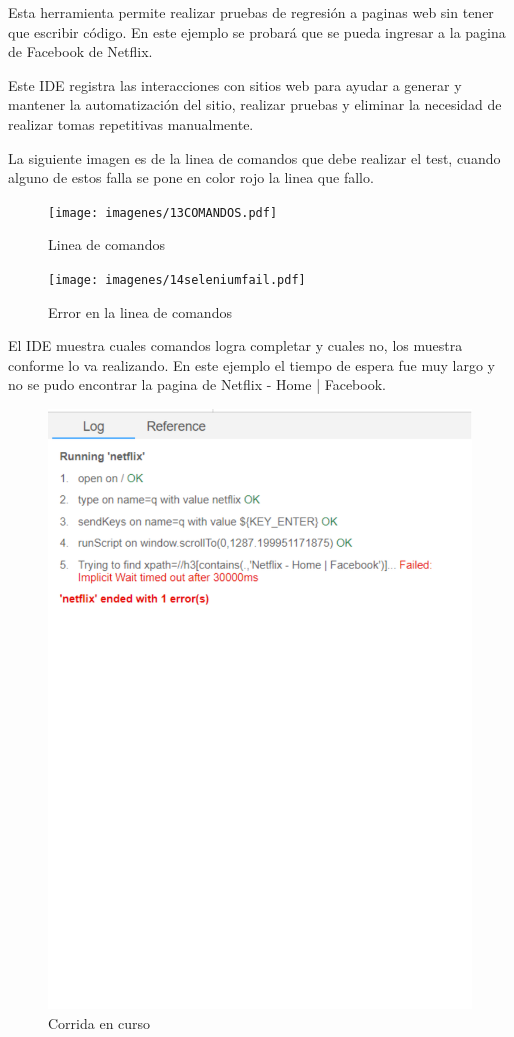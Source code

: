 \documentclass[conference]{IEEEtran}
\begin{document}
Esta herramienta permite realizar pruebas de regresión  a paginas web sin tener que escribir código. En este ejemplo se probará que se pueda ingresar a la pagina de Facebook de Netflix. 

Este IDE registra las interacciones con sitios web para ayudar a generar y mantener la automatización del sitio, realizar pruebas y eliminar la necesidad de realizar tomas repetitivas manualmente.

La siguiente imagen es de la linea de comandos que debe realizar el test, cuando alguno de estos falla se pone en color rojo la linea que fallo.

\begin{figure}[H]
\centering
\texttt{[image: imagenes/13COMANDOS.pdf]}
\caption{Linea de comandos}
\end{figure}

\begin{figure}[H]
\centering
\texttt{[image: imagenes/14seleniumfail.pdf]}
\caption{Error en la linea de comandos}
\end{figure}

El IDE muestra cuales comandos logra completar y cuales no, los muestra conforme lo va realizando. En este ejemplo el tiempo de espera fue muy largo y no se pudo encontrar la pagina de Netflix - Home | Facebook.

\begin{figure}[H]
\centering
\includegraphics[scale=0.47]{imagenes/15Running.pdf}
\caption{Corrida en curso}
\end{figure}
\end{document}
